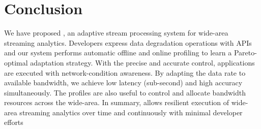 \section{Conclusion}
\label{sec:conclusion}

We have proposed \sysname{}, an adaptive stream processing system for wide-area
streaming analytics. Developers express data degradation operations with
\maybe{} APIs and our system performs automatic offline and online profiling to
learn a Pareto-optimal adaptation strategy. With the precise and accurate
control, \sysname{} applications are executed with network-condition awareness.
By adapting the data rate to available bandwidth, we achieve low latency
(sub-second) and high accuracy simultaneously. The profiles are also useful to
control and allocate bandwidth resources across the wide-area. In summary,
\sysname{} allows resilient execution of wide-area streaming analytics over time
and continuously with minimal developer efforts

